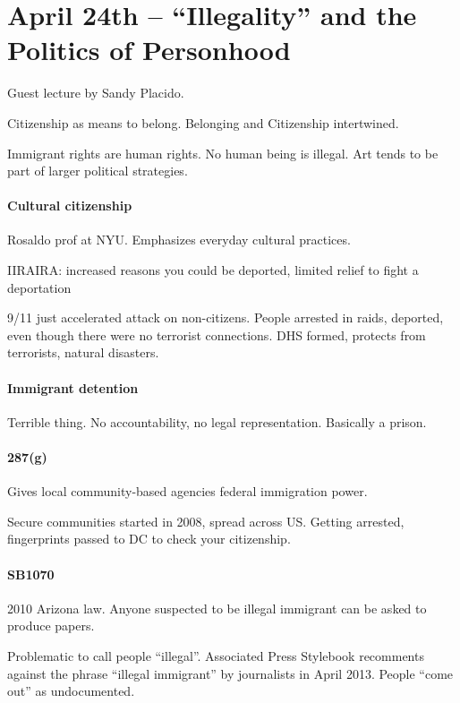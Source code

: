 \section{April 24th -- ``Illegality'' and the Politics of Personhood}

Guest lecture by Sandy Placido.

Citizenship as means to belong. Belonging and Citizenship intertwined.

Immigrant rights are human rights. No human being is illegal. Art tends to be part of larger political strategies.

\paragraph{Cultural citizenship} Rosaldo prof at NYU. Emphasizes everyday cultural practices.

IIRAIRA: increased reasons you could be deported, limited relief to fight a deportation

9/11 just accelerated attack on non-citizens. People arrested in raids, deported, even though there were no terrorist connections. DHS formed, protects from terrorists, natural disasters.

\paragraph{Immigrant detention} Terrible thing. No accountability, no legal representation. Basically a prison.

\paragraph{287(g)} Gives local community-based agencies federal immigration power.

Secure communities started in 2008, spread across US. Getting arrested, fingerprints passed to DC to check your citizenship.

\paragraph{SB1070} 2010 Arizona law. Anyone suspected to be illegal immigrant can be asked to produce papers.

Problematic to call people ``illegal''. Associated Press Stylebook recomments against the phrase ``illegal immigrant'' by journalists in April 2013. People ``come out'' as undocumented.

